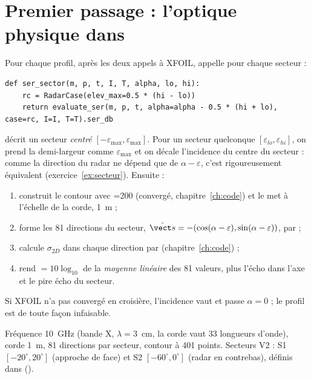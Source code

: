 \section{Premier passage : l'optique physique dans }
Pour chaque profil, après les deux appels à XFOIL,  appelle pour chaque secteur :
\begin{lstlisting}
def ser_sector(m, p, t, I, T, alpha, lo, hi):
    rc = RadarCase(elev_max=0.5 * (hi - lo))
    return evaluate_ser(m, p, t, alpha=alpha - 0.5 * (hi + lo), case=rc, I=I, T=T).ser_db
\end{lstlisting}
 décrit un secteur \emph{centré} $[-\varepsilon_{\max},\varepsilon_{\max}]$. Pour un secteur quelconque $[\varepsilon_{lo},\varepsilon_{hi}]$, on prend la demi-largeur comme $\varepsilon_{\max}$ et on décale l'incidence du centre du secteur : comme la direction du radar ne dépend que de $\alpha-\varepsilon$, c'est rigoureusement équivalent (exercice~\ref{ex:secteur}). Ensuite  :
\begin{enumerate}
\item construit le contour  avec =200 (convergé, chapitre~\ref{ch:code}) et le met à l'échelle de la corde, 1~m ;
\item forme les 81 directions du secteur, $\shat=-(\cos(\alpha-\varepsilon),\sin(\alpha-\varepsilon))$, par  ;
\item calcule $\sigma_{2D}$ dans chaque direction par  (chapitre~\ref{ch:code}) ;
\item rend  $=10\log_{10}$ de la \emph{moyenne linéaire} des 81 valeurs, plus l'écho dans l'axe et le pire écho du secteur.
\end{enumerate}
Si XFOIL n'a pas convergé en croisière, l'incidence vaut  et  passe $\alpha=0$ ; le profil est de toute façon infaisable.

\begin{codebox}
Fréquence 10~GHz (bande X, $\lambda=3$~cm, la corde vaut 33 longueurs d'onde), corde 1~m, 81 directions par secteur, contour à 401 points. Secteurs V2 : S1 $[-20^\circ,20^\circ]$ (approche de face) et S2 $[-60^\circ,0^\circ]$ (radar en contrebas), définis dans  ().
\end{codebox}

